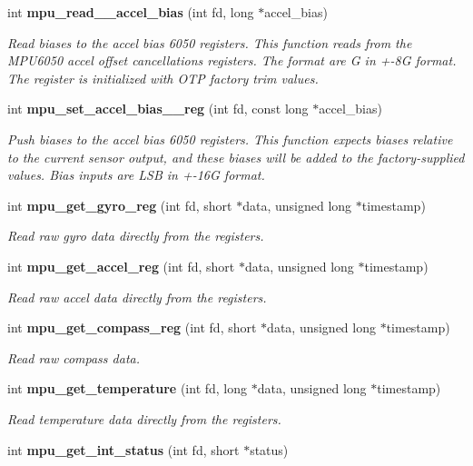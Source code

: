 \begin{DoxyCompactItemize}
int \textbf{ mpu\+\_\+read\+\_\+\_\+accel\+\_\+bias} (int fd, long $\ast$accel\+\_\+bias)
\begin{DoxyCompactList}\small\item\em Read biases to the accel bias 6050 registers. This function reads from the M\+P\+U6050 accel offset cancellations registers. The format are G in +-\/8G format. The register is initialized with O\+TP factory trim values. \end{DoxyCompactList}\item 
int \textbf{ mpu\+\_\+set\+\_\+accel\+\_\+bias\+\_\+\_\+reg} (int fd, const long $\ast$accel\+\_\+bias)
\begin{DoxyCompactList}\small\item\em Push biases to the accel bias 6050 registers. This function expects biases relative to the current sensor output, and these biases will be added to the factory-\/supplied values. Bias inputs are L\+SB in +-\/16G format. \end{DoxyCompactList}\item 
int \textbf{ mpu\+\_\+get\+\_\+gyro\+\_\+reg} (int fd, short $\ast$data, unsigned long $\ast$timestamp)
\begin{DoxyCompactList}\small\item\em Read raw gyro data directly from the registers. \end{DoxyCompactList}\item 
int \textbf{ mpu\+\_\+get\+\_\+accel\+\_\+reg} (int fd, short $\ast$data, unsigned long $\ast$timestamp)
\begin{DoxyCompactList}\small\item\em Read raw accel data directly from the registers. \end{DoxyCompactList}\item 
int \textbf{ mpu\+\_\+get\+\_\+compass\+\_\+reg} (int fd, short $\ast$data, unsigned long $\ast$timestamp)
\begin{DoxyCompactList}\small\item\em Read raw compass data. \end{DoxyCompactList}\item 
int \textbf{ mpu\+\_\+get\+\_\+temperature} (int fd, long $\ast$data, unsigned long $\ast$timestamp)
\begin{DoxyCompactList}\small\item\em Read temperature data directly from the registers. \end{DoxyCompactList}\item 
int \textbf{ mpu\+\_\+get\+\_\+int\+\_\+status} (int fd, short $\ast$status)

\end{DoxyCompactItemize}
